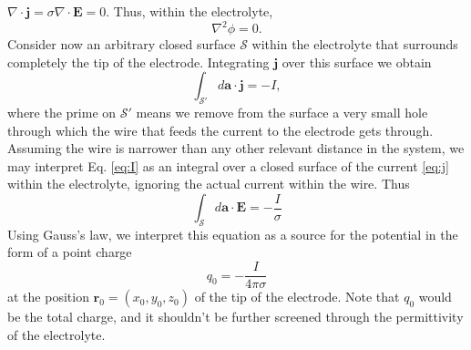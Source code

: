 \documentclass{article}
\begin{document}
$\nabla\cdot \bm j = \sigma\nabla\cdot\bm E=0$. Thus, within the electrolyte,
\begin{equation}
  \label{eq:laplace}
\nabla^{2} \phi=0.
\end{equation}
Consider now an arbitrary closed surface
$\mathcal S$
within the electrolyte that surrounds completely the tip of the
electrode. Integrating $ \bm j$ over this surface we obtain
\begin{equation}
  \label{eq:I}
\int_{\mathcal S'} d\bm a \cdot \bm j = -I,
\end{equation}
where the prime on $\mathcal S'$ means we remove from the surface a
very small hole through which the wire that feeds the current to the
electrode gets
through. Assuming the wire is narrower than any other relevant
distance in the system, we may interpret Eq. \eqref{eq:I} as an
integral over a closed surface of the current \eqref{eq:j} within the
electrolyte, ignoring the actual current within the wire. Thus
\begin{equation}
  \label{eq:gauss}
  \int_{\mathcal S} d\bm a \cdot \bm E = -\frac{I}{\sigma}
\end{equation}
Using Gauss's law, we interpret this equation as a source for the
potential in the form of a point charge
\begin{equation}
  q_0 = -\frac{I}{4 \pi \sigma}
\end{equation}
at the position $\bm r_0=(x_0, y_0, z_0)$ of the
tip of the electrode. Note that $q_0$ would be the total charge,
and it shouldn't be further screened through the permittivity of the
electrolyte.
\end{document}
